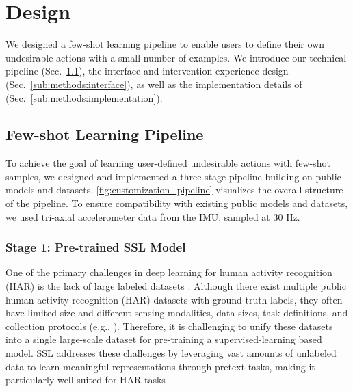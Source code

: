 \section{\projectname Design}
\label{sec:methods}
We designed a few-shot learning pipeline to enable users to define their own undesirable actions with a small number of examples.
We introduce our technical pipeline (Sec.~\ref{sub:methods:system}), the interface and intervention experience design (Sec.~\ref{sub:methods:interface}), as well as the implementation details of \projectname (Sec.~\ref{sub:methods:implementation}).

\subsection{Few-shot Learning Pipeline}
\label{sub:methods:system}
To achieve the goal of learning user-defined undesirable actions with few-shot samples, we designed and implemented a three-stage pipeline building on public models and datasets.
\autoref{fig:customization_pipeline} visualizes the overall structure of the pipeline.
To ensure compatibility with existing public models and datasets, we used tri-axial accelerometer data from the IMU, sampled at 30 Hz.

\subsubsection{Stage 1: Pre-trained SSL Model}
\label{subsub:methods:system:pretrain}

One of the primary challenges in deep learning for human activity recognition (HAR) is the lack of large labeled datasets \cite{yuan2024self, leng2024imugpt}.
Although there exist multiple public human activity recognition (HAR) datasets with ground truth labels, they often have limited size and different sensing modalities, data sizes, task definitions, and collection protocols (e.g., \cite{hu2020fine,chen2015utd,opportunity_activity_recognition_226,matey2023dataset,ada_alevizaki_2022_7092553,mallol_ragolta_2022_6517688,alexander_holzemann_2024_7654684,herrera2019monitoring,ofli2013berkeley,de2009guide,kirmizis_2021_4507451,kyritsis_2021_4421861,vaizman2017recognizing, hu_2022_7058383}). Therefore, it is challenging to unify these datasets into a single large-scale dataset for pre-training a supervised-learning based model.
SSL addresses these challenges by leveraging vast amounts of unlabeled data to learn meaningful representations through pretext tasks, making it particularly well-suited for HAR tasks \cite{saeed2019multi}.

